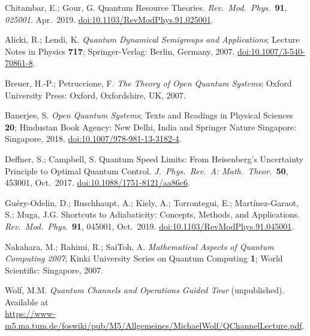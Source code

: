 \documentclass[preprints,article,accept,moreauthors,pdftex]{Definitions/mdpi}
\begin{document}
\begin{thebibliography}{999}
Chitambar, E.; Gour, G\@. Quantum Resource Theories. {\em Rev.\ Mod.\ Phys.}\ {\bf 91}, {\em 025001}. Apr.\ 2019. \href{https://doi.org/10.1103/RevModPhys.91.025001}{doi:10.1103/RevModPhys.91.025001}.

Alicki, R.; Lendi, K\@. \emph{Quantum Dynamical Semigroups and Applications}; Lecture Notes in Physics {\bf 717}; Springer-Verlag: Berlin, Germany, 2007. \href{https://doi.org/10.1007/3-540-70861-8}{doi:10.1007/3-540-70861-8}.

Breuer, H.-P.; Petruccione, F\@. \emph{The Theory of Open Quantum Systems}; Oxford University Press: Oxford, Oxfordshire, UK, 2007.

Banerjee, S\@. \emph{Open Quantum Systems}; Texts and Readings in Physical Sciences \textbf{20}; Hindustan Book Agency: New Delhi, India and Springer Nature Singapore: Singapore, 2018. \href{https://doi.org/10.1007/978-981-13-3182-4}{doi:10.1007/978-981-13-3182-4}.

Deffner, S.; Campbell, S\@. Quantum Speed Limits: From Heisenberg's Uncertainty Principle to Optimal Quantum Control. {\em J.\ Phys.\ Rev.\ A: Math.\ Theor.}\ {\bf 50}, 453001, Oct.\ 2017. \href{https://doi.org/10.1088/1751-8121/aa86c6}{doi:10.1088/1751-8121/aa86c6}.

Guéry-Odelin, D.; Ruschhaupt, A.; Kiely, A.; Torrontegui, E.; Martínez-Garaot, S.; Muga, J.G\@. Shortcuts to Adiabaticity: Concepts, Methods, and Applications. {\em Rev.\ Mod.\ Phys.}\ {\bf 91}, 045001, Oct.\ 2019. \href{https://doi.org/10.1103/RevModPhys.91.045001}{doi:10.1103/RevModPhys.91.045001}.

Nakahara, M.; Rahimi, R.; SaiToh, A\@. \emph{Mathematical Aspects of Quantum Computing 2007}; Kinki University Series on Quantum Computing {\bf 1}; World Scientific: Singapore, 2007.

Wolf, M.M\@. \emph{Quantum Channels and Operations Guided Tour} (unpublished). Available at
\\[0pt]
\href{https://www-m5.ma.tum.de/foswiki/pub/M5/Allgemeines/MichaelWolf/QChannelLecture.pdf}{https://www-m5.ma.tum.de/foswiki/pub/M5/Allgemeines/MichaelWolf/QChannelLecture.pdf}.


\end{thebibliography}
\end{document}
